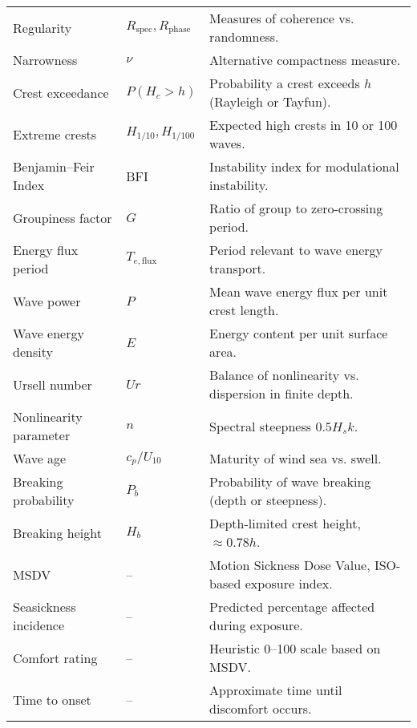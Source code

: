 \documentclass[11pt]{article}
\begin{document}
\begin{longtable}{|l|l|p{8cm}|}
Regularity & $R_{\text{spec}}, R_{\text{phase}}$ & Measures of coherence vs. randomness. \\
Narrowness & $\nu$ & Alternative compactness measure. \\
\hline
Crest exceedance & $P(H_c>h)$ & Probability a crest exceeds $h$ (Rayleigh or Tayfun). \\
Extreme crests & $H_{1/10}, H_{1/100}$ & Expected high crests in 10 or 100 waves. \\
Benjamin–Feir Index & BFI & Instability index for modulational instability. \\
Groupiness factor & $G$ & Ratio of group to zero-crossing period. \\
\hline
Energy flux period & $T_{e,\text{flux}}$ & Period relevant to wave energy transport. \\
Wave power & $P$ & Mean wave energy flux per unit crest length. \\
Wave energy density & $E$ & Energy content per unit surface area. \\
\hline
Ursell number & $Ur$ & Balance of nonlinearity vs. dispersion in finite depth. \\
Nonlinearity parameter & $n$ & Spectral steepness $0.5H_sk$. \\
Wave age & $c_p/U_{10}$ & Maturity of wind sea vs. swell. \\
\hline
Breaking probability & $P_b$ & Probability of wave breaking (depth or steepness). \\
Breaking height & $H_b$ & Depth-limited crest height, $\approx 0.78 h$. \\
\hline
MSDV & -- & Motion Sickness Dose Value, ISO-based exposure index. \\
Seasickness incidence & -- & Predicted percentage affected during exposure. \\
Comfort rating & -- & Heuristic 0--100 scale based on MSDV. \\
Time to onset & -- & Approximate time until discomfort occurs. \\
\hline
\end{longtable}
\end{document}
